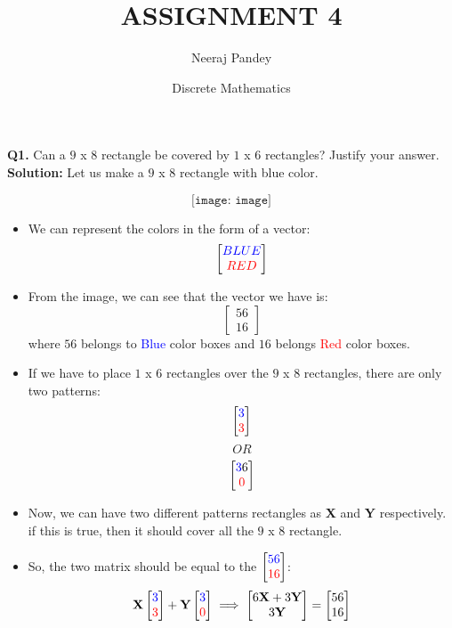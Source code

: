 \documentclass{article}
\title{ASSIGNMENT 4}
\author{Neeraj Pandey}
\date{Discrete Mathematics}
\begin{document}
\maketitle
\begin{flushleft}
\textbf{Q1. } Can a $9$ x $8$ rectangle be covered by $1$ x $6$ rectangles? Justify your answer.
\newline
\newline
\textbf{Solution: } Let us make a $9$ x $8$ rectangle with blue color.

\[\texttt{[image: image]}\]
\newline
\begin{itemize}
    \item We can represent the colors in the form of a vector:
        \[\begin{bmatrix}\textcolor{blue}{BLUE}\\\textcolor{red}{RED}\end{bmatrix}\]
    \item From the image, we can see that the vector we have is:
        \[\begin{bmatrix}56\\16\end{bmatrix}\]
        where $56$ belongs to \textcolor{blue}{Blue} color boxes and $16$ belongs \textcolor{red}{Red} color boxes.
    \item If we have to place $1$ x $6$ rectangles over the $9$ x $8$ rectangles, there are only two patterns:
        \[\begin{bmatrix}\textcolor{blue}{3}\\\textcolor{red}{3}\end{bmatrix}\]
        \[OR\]
        \[\begin{bmatrix}\textcolor{blue}{3}6\\\textcolor{red}{0}\end{bmatrix}\]
    \item Now, we can have two different patterns rectangles as \textbf{X} and \textbf{Y} respectively. if this is true, then it should cover all the $9$ x $8$ rectangle.
    \item So, the two matrix should be equal to the $\begin{bmatrix} \textcolor{blue}{56}\\\textcolor{red}{16}\end{bmatrix}$:
    \[\textbf{X}\begin{bmatrix} \textcolor{blue}{3}\\\textcolor{red}{3}\end{bmatrix} + \textbf{Y}\begin{bmatrix} \textcolor{blue}{3}\\\textcolor{red}{0}\end{bmatrix}  \implies \begin{bmatrix}6\textbf{X} + 3\textbf{Y} \\ 3\textbf{Y} \end{bmatrix} = \begin{bmatrix} 56\\16 \end{bmatrix} \]

\end{itemize}
\end{flushleft}
\end{document}
